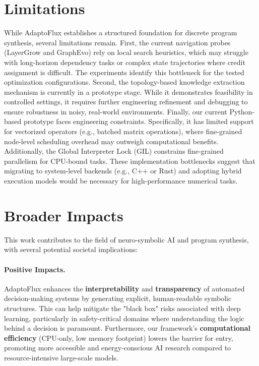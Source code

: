 \section{Limitations}
While AdaptoFlux establishes a structured foundation for discrete program synthesis, several limitations remain. First, the current navigation probes (LayerGrow and GraphEvo) rely on local search heuristics, which may struggle with long-horizon dependency tasks or complex state trajectories where credit assignment is difficult. The experiments identify this bottleneck for the tested optimization configurations. Second, the topology-based knowledge extraction mechanism is currently in a prototype stage. While it demonstrates feasibility in controlled settings, it requires further engineering refinement and debugging to ensure robustness in noisy, real-world environments. Finally, our current Python-based prototype faces engineering constraints. Specifically, it has limited support for vectorized operators (e.g., batched matrix operations), where fine-grained node-level scheduling overhead may outweigh computational benefits. Additionally, the Global Interpreter Lock (GIL) constrains fine-grained parallelism for CPU-bound tasks. These implementation bottlenecks suggest that migrating to system-level backends (e.g., C++ or Rust) and adopting hybrid execution models would be necessary for high-performance numerical tasks.

\section{Broader Impacts}
\label{app:broader_impacts}

This work contributes to the field of neuro-symbolic AI and program synthesis, with several potential societal implications:

\paragraph{Positive Impacts.}
AdaptoFlux enhances the \textbf{interpretability} and \textbf{transparency} of automated decision-making systems by generating explicit, human-readable symbolic structures. This can help mitigate the "black box" risks associated with deep learning, particularly in safety-critical domains where understanding the logic behind a decision is paramount. Furthermore, our framework's \textbf{computational efficiency} (CPU-only, low memory footprint) lowers the barrier for entry, promoting more accessible and energy-conscious AI research compared to resource-intensive large-scale models.

